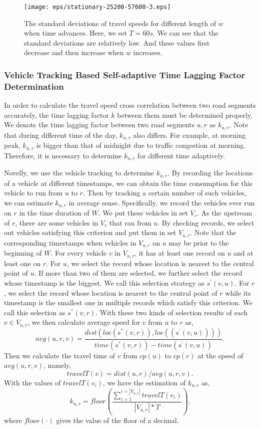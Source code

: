 \documentclass[twocolumn,10pt,final,conference]{IEEEtran}
\begin{document}
\begin{figure}[h]
\centering
{
\texttt{[image: eps/stationary-25200-57600-3.eps]}
}
\caption{The standard deviations of travel speeds for different length of $w$ when time advances. Here, we set $T=60s$. We can see that the standard deviations are relatively low. And these values first decrease and then increase when $w$ increases. }
\label{fig-OneCentralRoadsTS}
\end{figure}
\subsubsection{Vehicle Tracking Based Self-adaptive Time Lagging Factor Determination}\label{section-sub-Time Lagging}
\quad

In order to calculate the travel speed cross correlation between two road segments accurately, the time lagging factor $k$ between them must be determined properly.
We denote the time lagging factor between two road segments $u,r$ as $k_{u,r}$. Note that during different time of the day, $k_{u,r}$ also differs. For example, at morning peak, $k_{u,r}$  is bigger than that of midnight due to traffic congestion at morning. Therefore, it is necessary to determine $k_{u,r}$ for different time adaptively.

Novelly, we use the vehicle tracking to determine $k_{u,r}$. By recording the locations of a vehicle at different timestamps, we can obtain the time consumption for this vehicle to run from $u$ to $r$. Then by tracking a certain number of such vehicles, we can estimate $k_{u,r}$ in  average sense.
Specifically, we record the vehicles ever run on $r$ in the time duration of $W$. We put these vehicles in set $V_r$. As the upstream of $r$, there are some vehicles in $V_r$ that ran from $u$. By checking records, we select out vehicles satisfying this criterion and put them in set $V_{u,r}$. Note that the corresponding timestamps when vehicles in $V_{u,r}$ on $u$ may be prior to the beginning of $W$. For every vehicle $v$ in $V_{u,r}$, it has at least one record on $u$ and at least one on $r$. For $u$, we select the record whose location is nearest to the central point of $u$. If more than two of them are selected, we further select the record whose timestamp is the biggest. We call this selection strategy as $s^{'}(v,u)$. For $r$, we select the record whose location is nearest to the central point of $r$ while its timestamp is the smallest one in multiple records which satisfy this criterion. We call this selection as $s^{''}(v,r)$. With these two kinds of selection results of each $v\in V_{u,r}$, we then calculate average speed for $v$ from $u$ to $r$ as,
\[
avg(u,r,v)=\frac{dist(loc(s^{''}(v,r)),loc((s^{'}(v,u))))}{time(s^{''}(v,r))-time(s^{'}(v,u))}.
\]
Then we calculate the travel time of $v$ from $cp(u)$ to $cp(r)$ at the speed of $avg(u,r,v)$, namely,
\[
travelT(v)={dist(u,r)}/{avg(u,r,v)}.
\]
With the values of $travelT(v_i)$, we have the estimation of $k_{u,r}$ as,
\[
k_{u,r}=floor\left(\frac{\sum_{i=1}^{i=|V_{u,r}|}travelT(v_i)}{|V_{u,r}|*T}\right).
\]
where $floor(\cdot)$ gives the value of the floor of a decimal.
\end{document}
